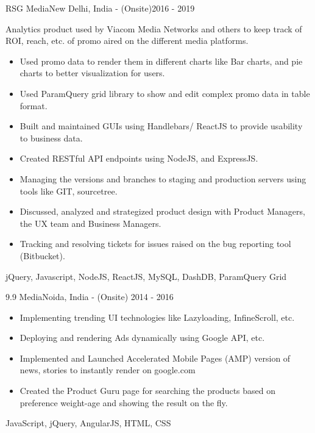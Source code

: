 \begin{projects}
    \project
    {RSG Media}{New Delhi, India - (Onsite)}{2016 - 2019}
    {}
    {Analytics product used by Viacom Media Networks and others to keep track of ROI, reach, etc. of promo aired on the different media platforms.
    \begin{itemize}
        \item Used promo data to render them in different charts like Bar charts, and pie charts to better visualization for users.
        \item Used ParamQuery grid library to show and edit complex promo data in table format.
        \item Built and maintained GUIs using Handlebars/ ReactJS to provide usability to business data.
        \item Created RESTful API endpoints using NodeJS, and ExpressJS.
        \item Managing the versions and branches to staging and production servers using tools like GIT, sourcetree.
        \item Discussed, analyzed and strategized product design with Product Managers, the UX team and Business Managers.
        \item Tracking and resolving tickets for issues raised on the bug reporting tool (Bitbucket).
    \end{itemize}}
    {jQuery, Javascript, NodeJS, ReactJS, MySQL, DashDB, ParamQuery Grid}

    \project
    {9.9 Media}{Noida, India - (Onsite)} {2014 - 2016}
    {}
    {\begin{itemize}
        \item Implementing trending UI technologies like Lazyloading, InfineScroll, etc.
        \item Deploying and rendering Ads dynamically using Google API, etc.
        \item Implemented and Launched Accelerated Mobile Pages (AMP) version of news, stories to instantly render on google.com
        \item Created the Product Guru page for searching the products based on preference weight-age and showing the result on the fly.
    \end{itemize}}
    {JavaScript, jQuery, AngularJS, HTML, CSS}
    

\end{projects}
